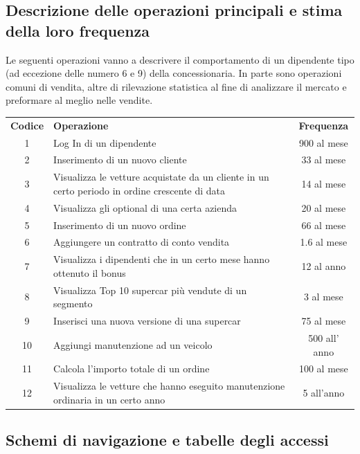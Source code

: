 \documentclass[12pt]{article}
\begin{document}
\newpage

\subsection{Descrizione delle operazioni principali e stima della loro frequenza}

Le seguenti operazioni vanno a descrivere il comportamento di un dipendente tipo
(ad eccezione delle numero 6 e 9) della concessionaria. In parte sono operazioni
comuni di vendita, altre di rilevazione statistica al fine di analizzare il
mercato e preformare al meglio nelle vendite. 

\begin{table}[htbp]
    \centering
    \small
    \begin{tabularx}{\linewidth}{c X c}
      \rowcolor{red!20!}
      \textbf{Codice} & \textbf{Operazione} & \textbf{Frequenza} \\
      1 & Log In di un dipendente & 900 al mese \\
      2 & Inserimento di un nuovo cliente & 33 al mese \\
      3 & Visualizza le vetture acquistate da un cliente in un certo periodo in
      ordine crescente di data & 14 al mese \\
      4 & Visualizza gli optional di una certa azienda & 20 al mese \\
      5 & Inserimento di un nuovo ordine & 66 al mese \\
      6 & Aggiungere un contratto di conto vendita & 1.6 al mese \\
      7 & Visualizza i dipendenti che in un certo mese hanno ottenuto il bonus & 12
      al anno \\
      8 & Visualizza Top 10 supercar più vendute di un segmento & 3 al mese \\
      9 & Inserisci una nuova versione di una supercar & 75 al mese \\
      10 & Aggiungi manutenzione ad un veicolo & 500 all' anno \\
      11 & Calcola l'importo totale di un ordine & 100 al mese \\
      12 & Visualizza le vetture che hanno eseguito manutenzione ordinaria in un
      certo anno & 5 all'anno \\
    \end{tabularx}
    \label{tab:tabella_frequenze}
\end{table}
\subsection{Schemi di navigazione e tabelle degli accessi}
\end{document}
